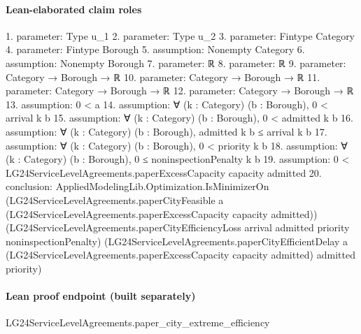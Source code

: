 \documentclass[10pt]{article}
\begin{document}
\paragraph{Lean-elaborated claim roles}\begin{ReviewVerbatim}
1. parameter: Type u_1
2. parameter: Type u_2
3. parameter: Fintype Category
4. parameter: Fintype Borough
5. assumption: Nonempty Category
6. assumption: Nonempty Borough
7. parameter: ℝ
8. parameter: ℝ
9. parameter: Category → Borough → ℝ
10. parameter: Category → Borough → ℝ
11. parameter: Category → Borough → ℝ
12. parameter: Category → Borough → ℝ
13. assumption: 0 < a
14. assumption: ∀ (k : Category) (b : Borough), 0 < arrival k b
15. assumption: ∀ (k : Category) (b : Borough), 0 < admitted k b
16. assumption: ∀ (k : Category) (b : Borough), admitted k b ≤ arrival k b
17. assumption: ∀ (k : Category) (b : Borough), 0 < priority k b
18. assumption: ∀ (k : Category) (b : Borough), 0 ≤ noninspectionPenalty k b
19. assumption: 0 < LG24ServiceLevelAgreements.paperExcessCapacity capacity admitted
20. conclusion: AppliedModelingLib.Optimization.IsMinimizerOn
  (LG24ServiceLevelAgreements.paperCityFeasible a (LG24ServiceLevelAgreements.paperExcessCapacity capacity admitted))
  (LG24ServiceLevelAgreements.paperCityEfficiencyLoss arrival admitted priority noninspectionPenalty)
  (LG24ServiceLevelAgreements.paperCityEfficientDelay a
    (LG24ServiceLevelAgreements.paperExcessCapacity capacity admitted) admitted priority)
\end{ReviewVerbatim}

\paragraph{Lean proof endpoint (built separately)}\begin{ReviewVerbatim}
LG24ServiceLevelAgreements.paper_city_extreme_efficiency
\end{ReviewVerbatim}
\end{document}

